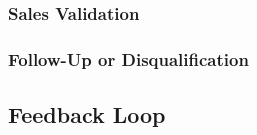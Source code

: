         \subsubsection{Sales Validation}\mbox{}
        \subsubsection{Follow-Up or Disqualification}\mbox{}
    \subsection{Feedback Loop}\mbox{}

